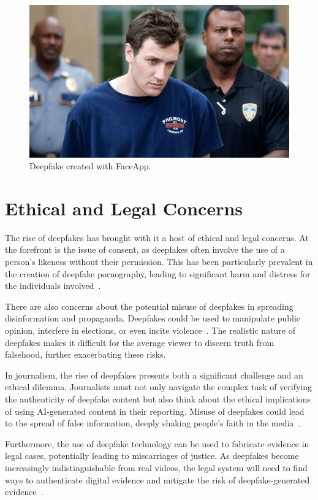\begin{figure}[ht]
	\centering
	\includegraphics[width=0.61\columnwidth]{figures/faceapp}
	\caption{Deepfake created with FaceApp.} %
\end{figure}


\section{Ethical and Legal Concerns}\label{chapter:legal}
The rise of deepfakes has brought with it a host of ethical and legal concerns.
At the forefront is the issue of consent, as deepfakes often involve the
use of a person's likeness without their permission. This has been
particularly prevalent in the creation of deepfake pornography, leading
to significant harm and distress for the individuals involved~\cite{chesney2019deep}.

There are also concerns about the potential misuse of deepfakes in spreading
disinformation and propaganda. Deepfakes could be used to manipulate public
opinion, interfere in elections, or even incite violence~\cite{deepfakes-business-insider,partnershiponai}.
The realistic nature of deepfakes makes it difficult for the average viewer
to discern truth from falsehood, further exacerbating these risks.

In journalism, the rise of deepfakes presents both a significant
challenge and an ethical dilemma. Journalists must not only navigate
the complex task of verifying the authenticity of deepfake content
but also think about the ethical implications of using \ac{AI}-generated
content in their reporting. Misuse of deepfakes could lead to the spread of
false information, deeply shaking people's faith in the media~\cite{doi:10.1177/2056305120903408}.

Furthermore, the use of deepfake technology can be used to fabricate evidence in
legal cases, potentially leading to miscarriages of justice. As deepfakes become
increasingly indistinguishable from real videos, the legal system will need to
find ways to authenticate digital evidence and mitigate the risk of deepfake-generated
evidence~\cite{chesney2019deep}.

